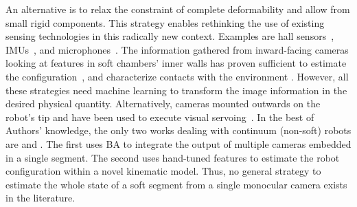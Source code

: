 An alternative is to relax the constraint of complete deformability and allow from small rigid components. This strategy enables rethinking the use of existing sensing technologies in this radically new context. Examples are hall sensors~\cite{guo2019continuum}, IMUs~\cite{hughes2020sensing}, and microphones~\cite{zoller2018acoustic}. %
%
The information gathered from inward-facing cameras looking at features in soft chambers' inner walls has proven sufficient to estimate the configuration~\cite{she2020exoskeleton,werner2020vision}, and characterize contacts with the environment \cite{ward2018tactip,lin2020curvature}. However, all these strategies need machine learning to transform the image information in the desired physical quantity.
%
%
%
%
%
%
%
%
Alternatively, cameras mounted outwards on the robot's tip and have been used to execute visual servoing~\cite{homberg2019robust}.
%
In the best of Authors' knowledge, the only two works dealing with continuum (non-soft) robots are \cite{weber2012multi} and \cite{cheng2020approximate}.
% 
The first uses \gls{BA} to integrate the output of multiple cameras embedded in a single segment. The second uses hand-tuned features to estimate the robot configuration within a novel kinematic model. Thus, no general strategy to estimate the whole state of a soft segment from a single monocular camera exists in the literature.

